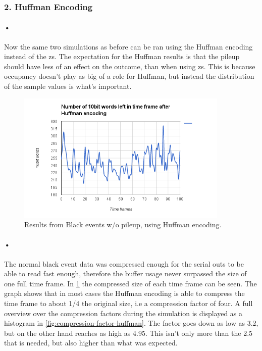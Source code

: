 \documentclass[a4paper, 12pt, openright, twoside]{report}
\begin{document}
\subsubsection{2. Huffman Encoding}

\paragraph{•}
Now the same two simulations as before can be ran using the Huffman encoding instead of the \gls{zs}.
The expectation for the Huffman results is that the pileup should have less of an effect on the outcome, than when using \gls{zs}.
This is because occupancy doesn't play as big of a role for Huffman, but instead the distribution of the sample values is what's important.

\begin{figure}[h!]
	\centering
		\includegraphics[width=0.9\textwidth]{images/blackevents-huffman.png}
		\caption{Results from Black events w/o pileup, using Huffman encoding.}
		\label{fig:blackevents-huffman}
\end{figure}

\paragraph{•}
The normal black event data was compressed enough for the serial outs to be able to read fast enough, therefore the buffer usage never surpassed the size of one full time frame.
In \ref{fig:blackevents-huffman} the compressed size of each time frame can be seen.
The graph shows that in most cases the Huffman encoding is able to compress the time frame to about 1/4 the original size, i.e a compression factor of four.
A full overview over the compression factors during the simulation is displayed as a histogram in \ref{fig:compression-factor-huffman}.
The factor goes down as low as 3.2, but on the other hand reaches as high as 4.95.
This isn't only more than the 2.5 that is needed, but also higher than what was expected.
\end{document}
